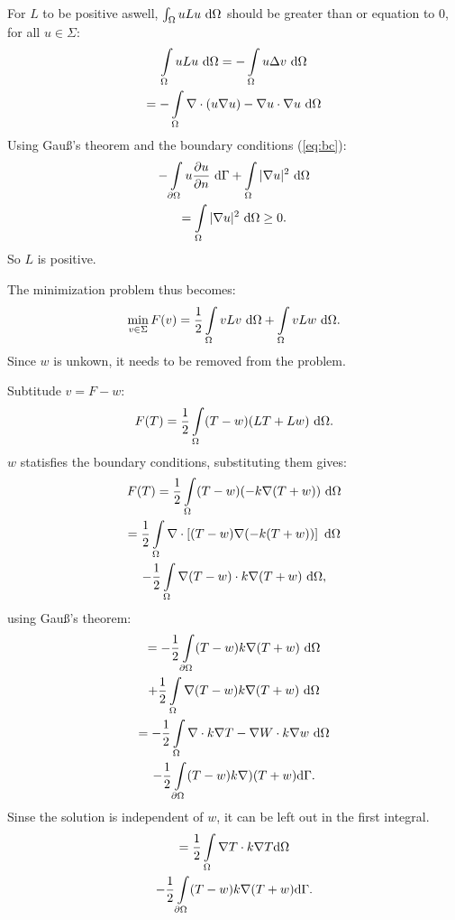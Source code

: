 For $L$ to be positive aswell, $\int\displaylimits_\Omega uLu~\mathrm{d}\Omega$ should be greater than or equation to 0, for all $u\in \Sigma$:
\begin{gather*}
    \int\displaylimits_\Omega uLu~\mathrm{d}\Omega = - \int\displaylimits_\Omega u\Delta v~\mathrm{d}\Omega\\
    = -\int\displaylimits_\Omega \nabla \cdot(u\nabla u) - \nabla u\cdot\nabla u~\mathrm{d}\Omega
\end{gather*} Using Gau\ss's theorem and the boundary conditions (\ref{eq:bc}):
\begin{gather*}
    -\int\displaylimits_{\partial\Omega} u\frac{\partial u}{\partial n}~\mathrm{d}\Gamma + \int\displaylimits_{\Omega} |\nabla u|^2~\mathrm{d}\Omega \\
    =\int\displaylimits_\Omega |\nabla u|^2~\mathrm{d}\Omega \geq 0.
\end{gather*} So $L$ is positive.

The minimization problem thus becomes:
\begin{equation}
    \min_{v\in\Sigma} F(v)=\frac{1}{2}\int\displaylimits_{\Omega}vLv~\mathrm{d}\Omega + \int\displaylimits_{\Omega}vLw~\mathrm{d}\Omega.
\end{equation} Since $w$ is unkown, it needs to be removed from the problem.

Subtitude $v=F-w$:
\begin{equation*}
F(T)=\frac{1}{2}\int\displaylimits_\Omega(T-w)(LT+Lw)~\mathrm{d}\Omega.
\end{equation*} $w$ statisfies the boundary conditions, substituting them gives:
\begin{gather*}
    F(T) = \frac{1}{2}\int\displaylimits_{\Omega}(T-w)(-k\nabla (T+w))~\mathrm{d}\Omega\\
    = \frac{1}{2}\int\displaylimits_{\Omega}\nabla\cdot\left[(T-w)\nabla(-k(T+w))\right]~\mathrm{d}\Omega\\
    - \frac{1}{2}\int\displaylimits_{\Omega}\nabla(T-w)\cdot k\nabla(T+w)~\mathrm{d}\Omega,
\end{gather*}using Gau\ss's theorem:
\begin{gather*}
    = -\frac{1}{2}\int\displaylimits_{\partial\Omega}(T-w)k\nabla(T+w)~\mathrm{d}\Omega\\
    + \frac{1}{2}\int\displaylimits_{\Omega}\nabla(T-w)k\nabla(T+w)~\mathrm{d}\Omega\\
    = -\frac{1}{2}\int\displaylimits_{\Omega}\nabla\cdot k\nabla T - \nabla W\cdot k\nabla w~\mathrm{d}\Omega\\
    -\frac{1}{2}\int\displaylimits_{\partial\Omega}(T-w)k\nabla)(T+w)\mathrm{d}\Gamma.
\end{gather*}Sinse the solution is independent of $w$, it can be left out in the first integral.
\begin{gather*}
    = \frac{1}{2}\int\displaylimits_{\Omega}\nabla T\cdot k\nabla T \mathrm{d}\Omega \\
    -\frac{1}{2}\int\displaylimits_{\partial\Omega}(T-w)k\nabla (T+w)\mathrm{d}\Gamma.
\end{gather*}

